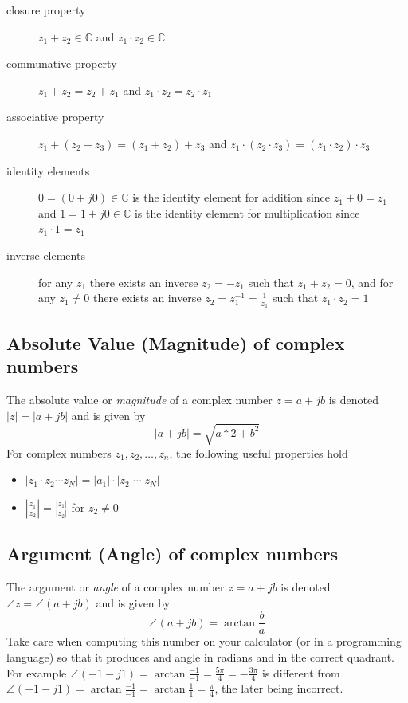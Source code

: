 \begin{description}
\item[closure property] $z_1 + z_2 \in \mathbb{C}$ and  $z_1 \cdot z_2 \in \mathbb{C}$ 
\item[communative property] $z_1 + z_2 = z_2 + z_1$ and $z_1 \cdot z_2 = z_2 \cdot z_1$ 
\item[associative property] $z_1 + (z_2 + z_3) = (z_1 + z_2) + z_3$ and $z_1 \cdot (z_2 \cdot z_3) = (z_1 \cdot z_2) \cdot z_3$ 
\item[identity elements] $0 = (0 + j0) \in \mathbb{C}$ is the identity element for addition since $z_1 + 0 = z_1$ and $1 = 1 + j0 \in \mathbb{C}$ is the identity element for multiplication since $z_1\cdot 1 = z_1$ 
\item[inverse elements] for any $z_1$ there exists an inverse $z_2 = -z_1$ such that $z_1 + z_2 = 0$, and for any $z_1 \neq 0$ there exists an inverse $z_2 = z_1^{-1} = \tfrac{1}{z_1}$ such that $z_1 \cdot z_2 = 1$
\end{description}

\subsection*{Absolute Value (Magnitude) of complex numbers}

The absolute value or \textit{magnitude} of a complex number $z = a + jb$ is denoted $|z| = |a+jb|$ and is given by
\[
|a + jb| = \sqrt{a*2 + b^2}
\]
For complex numbers $z_1, z_2, \ldots, z_n$, the following useful properties hold
\begin{itemize}
\item $|z_1\cdot z_2 \cdots z_N| = |a_1|\cdot |z_2|\cdots|z_N|$
\item $\left| \frac{z_1}{z_2}\right| = \frac{|z_1|}{|z_2|}$ for $z_2 \neq 0$
\end{itemize}

\subsection*{Argument (Angle) of complex numbers}
The argument or \textit{angle} of a complex number $z = a + jb$ is denoted $\angle z = \angle(a+jb)$ and is given by
\[
\angle(a + jb) = \arctan\frac{b}{a}
\]
Take care when computing this number on your calculator (or in a programming language) so that it produces and angle in radians and in the correct quadrant. For example $\angle(-1-j1) = \arctan\frac{-1}{-1} = \frac{5\pi}{4} = -\frac{3\pi}{4}$ is different from $\angle(-1-j1) = \arctan\frac{-1}{-1} = \arctan\frac{1}{1} = \frac{\pi}{4}$, the later being incorrect.

